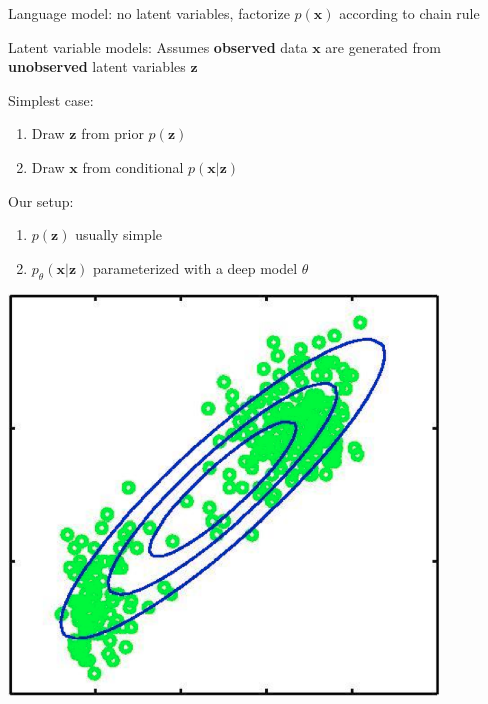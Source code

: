 \documentclass{beamer}
\let\tempone\itemize
\let\temptwo\enditemize
\renewenvironment{itemize}{\tempone\addtolength{\itemsep}{0.5\baselineskip}}{\temptwo}
\newcommand{\zvec}{\mathbf{z}}
\newcommand{\xvec}{\mathbf{x}}
\begin{document}
\begin{frame}
  \begin{center}
   \end{center}
\begin{itemize}
\item Language model: no latent variables, factorize $p(\xvec)$ according to chain rule
\item Latent variable models: Assumes \textbf{observed} data $\xvec$ are generated from \textbf{unobserved} latent variables $\zvec$
\item Simplest case:
\begin{enumerate}
\item Draw $\zvec$ from prior $p(\zvec)$ 
\item Draw $\xvec$ from conditional $p(\xvec | \zvec)$ 
\end{enumerate}
\item Our setup:
\begin{enumerate}
\item $p(\zvec)$ usually simple
\item $p_\theta(\xvec | \zvec)$  parameterized with a deep model $\theta$
 \end{enumerate}
\end{itemize}
\end{frame}

\begin{frame}
  \begin{center}
   \end{center}
   \center
\includegraphics[scale=0.5]{gmm1}
\end{frame}
\end{document}

